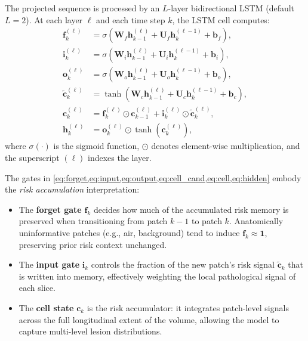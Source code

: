 \documentclass[11pt,a4paper]{article}
\begin{document}
The projected sequence is processed by an $L$-layer bidirectional LSTM
(default $L = 2$). At each layer $\ell$ and each time step $k$, the LSTM
cell computes:
\begin{align}
  \mathbf{f}_k^{(\ell)} &= \sigma\!\left(\mathbf{W}_f \mathbf{h}_{k-1}^{(\ell)} + \mathbf{U}_f \mathbf{h}_k^{(\ell-1)} + \mathbf{b}_f\right), \label{eq:forget}\\
  \mathbf{i}_k^{(\ell)} &= \sigma\!\left(\mathbf{W}_i \mathbf{h}_{k-1}^{(\ell)} + \mathbf{U}_i \mathbf{h}_k^{(\ell-1)} + \mathbf{b}_i\right), \label{eq:input}\\
  \mathbf{o}_k^{(\ell)} &= \sigma\!\left(\mathbf{W}_o \mathbf{h}_{k-1}^{(\ell)} + \mathbf{U}_o \mathbf{h}_k^{(\ell-1)} + \mathbf{b}_o\right), \label{eq:output}\\
  \tilde{\mathbf{c}}_k^{(\ell)} &= \tanh\!\left(\mathbf{W}_c \mathbf{h}_{k-1}^{(\ell)} + \mathbf{U}_c \mathbf{h}_k^{(\ell-1)} + \mathbf{b}_c\right), \label{eq:cell_cand}\\
  \mathbf{c}_k^{(\ell)} &= \mathbf{f}_k^{(\ell)} \odot \mathbf{c}_{k-1}^{(\ell)} + \mathbf{i}_k^{(\ell)} \odot \tilde{\mathbf{c}}_k^{(\ell)}, \label{eq:cell}\\
  \mathbf{h}_k^{(\ell)} &= \mathbf{o}_k^{(\ell)} \odot \tanh\!\left(\mathbf{c}_k^{(\ell)}\right), \label{eq:hidden}
\end{align}
where $\sigma(\cdot)$ is the sigmoid function, $\odot$ denotes element-wise
multiplication, and the superscript $(\ell)$ indexes the layer.

The gates in \cref{eq:forget,eq:input,eq:output,eq:cell_cand,eq:cell,eq:hidden}
embody the \emph{risk accumulation} interpretation:
\begin{itemize}
  \item The \textbf{forget gate} $\mathbf{f}_k$ decides how much of the accumulated
        risk memory is preserved when transitioning from patch $k-1$ to patch $k$.
        Anatomically uninformative patches (e.g., air, background) tend to induce
        $\mathbf{f}_k \approx \mathbf{1}$, preserving prior risk context unchanged.
  \item The \textbf{input gate} $\mathbf{i}_k$ controls the fraction of the new
        patch's risk signal $\tilde{\mathbf{c}}_k$ that is written into memory,
        effectively weighting the local pathological signal of each slice.
  \item The \textbf{cell state} $\mathbf{c}_k$ is the risk accumulator: it integrates
        patch-level signals across the full longitudinal extent of the volume, allowing
        the model to capture multi-level lesion distributions.
\end{itemize}
\end{document}
